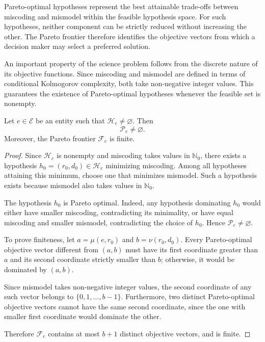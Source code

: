 Pareto-optimal hypotheses represent the best attainable trade-offs between miscoding and mismodel within the feasible hypothesis space. For such hypotheses, neither component can be strictly reduced without increasing the other. The Pareto frontier therefore identifies the objective vectors from which a decision maker may select a preferred solution.

An important property of the science problem follows from the discrete nature of its objective functions. Since miscoding and mismodel are defined in terms of conditional Kolmogorov complexity, both take non-negative integer values. This guarantees the existence of Pareto-optimal hypotheses whenever the feasible set is nonempty.

\begin{proposition}
\label{prop:science_pareto_existence}
Let $e\in\mathcal E$ be an entity such that $\mathcal H_e\neq\varnothing$. Then
\[
\mathcal P_e\neq\varnothing.
\]
Moreover, the Pareto frontier $\mathcal F_e$ is finite.
\end{proposition}

\begin{proof}
Since $\mathcal H_e$ is nonempty and miscoding takes values in $\mathbb N_0$, there exists a hypothesis
$h_0=(r_0,d_0)\in\mathcal H_e$ minimizing miscoding. Among all hypotheses attaining this minimum, choose one that minimizes mismodel. Such a hypothesis exists because mismodel also takes values in $\mathbb N_0$.

The hypothesis $h_0$ is Pareto optimal. Indeed, any hypothesis dominating $h_0$ would either have smaller miscoding, contradicting its minimality, or have equal miscoding and smaller mismodel, contradicting the choice of $h_0$. Hence $\mathcal P_e\neq\varnothing$.

To prove finiteness, let $a=\mu(e, r_0)$ and  $b=\nu(r_0,d_0)$. Every Pareto-optimal objective vector different from $(a,b)$ must have its first coordinate greater than $a$ and its second coordinate strictly smaller than $b$; otherwise, it would be dominated by $(a,b)$.

Since mismodel takes non-negative integer values, the second coordinate of any such vector belongs to
$\{0,1,\ldots,b-1\}$. Furthermore, two distinct Pareto-optimal objective vectors cannot have the same second coordinate, since the one with smaller first coordinate would dominate the other.

Therefore $\mathcal F_e$ contains at most $b+1$ distinct objective vectors, and is finite.
\end{proof}

